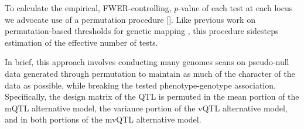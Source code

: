 \documentclass[9pt,twocolumn,twoside]{gsag3jnl}
\begin{document}


To calculate the empirical, FWER-controlling, $p$-value of each test at each locus we advocate use of a permutation procedure [\CortyMethodsPaper].
Like previous work on permutation-based thresholds for genetic mapping \citep{Churchill1994,Carlborg2002}, this procedure sidesteps estimation of the effective number of tests.

In brief, this approach involves conducting many genomes scans on pseudo-null data generated through permutation to maintain as much of the character of the data as possible, while breaking the tested phenotype-genotype association.
Specifically, the design matrix of the QTL is permuted in the mean portion of the mQTL alternative model, the variance portion of the vQTL alternative model, and in both portions of the mvQTL alternative model.
\end{document}
